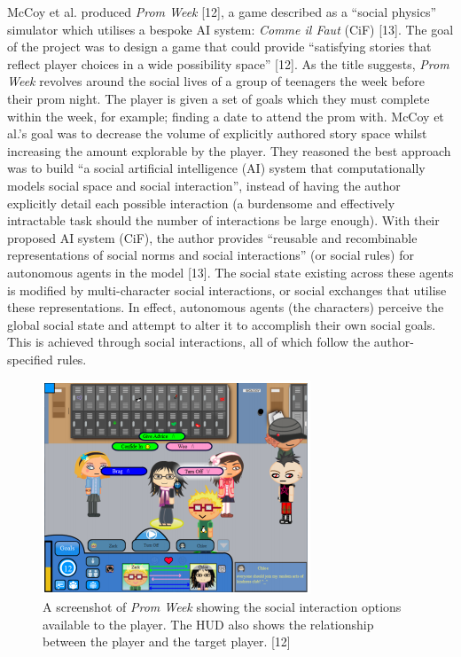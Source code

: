 \documentclass{sig-alternate-05-2015}
\begin{document}
McCoy et al. produced \textit{Prom Week} [12], a game described as a ``social physics'' simulator which utilises a bespoke AI system: \textit{Comme il Faut} (CiF) [13]. The goal of the project was to design a game that could provide ``satisfying stories that reflect player choices in a wide possibility space'' [12].
As the title suggests, \textit{Prom Week} revolves around the social lives of a group of teenagers the week before their prom night. The player is given a set of goals which they must complete within the week, for example; finding a date to attend the prom with. McCoy et al.'s goal was to decrease the volume of explicitly authored story space whilst increasing the amount explorable by the player. They reasoned the best approach was to build ``a social artificial intelligence (AI) system that computationally models social space and social interaction'', instead of having the author explicitly detail each possible interaction (a burdensome and effectively intractable task should the number of interactions be large enough). With their proposed AI system (CiF), the author provides ``reusable and recombinable representations of social norms and social interactions'' (or social rules) for autonomous agents in the model [13]. The social state existing across these agents is modified by multi-character social interactions, or social exchanges that utilise these representations. In effect, autonomous agents (the characters) perceive the global social state and attempt to alter it to accomplish their own social goals. This is achieved through social interactions, all of which follow the author-specified rules.\\

\begin{figure}
\centering
\includegraphics[scale=0.7]{Images/PromWeek.png}
\caption{A screenshot of \textit{Prom Week} showing the social interaction options available to the player. The HUD also shows the relationship between the player and the target player. [12]}
\end{figure}
\end{document}
